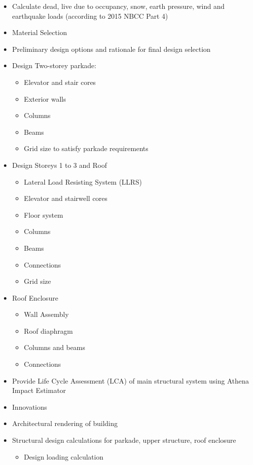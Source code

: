 \documentclass[12pt]{article}
\begin{document}
\begin{itemize}
    \item Calculate dead, live due to occupancy, snow, earth pressure, wind and earthquake loads (according to 2015 NBCC Part 4)
    \item Material Selection
    \item Preliminary design options and rationale for final design selection
    \item Design Two-storey parkade:
    \begin{itemize}
        \item Elevator and stair cores
        \item Exterior walls
        \item Columns
        \item Beams
        \item Grid size to satisfy parkade requirements
    \end{itemize}
    \item Design Storeys 1 to 3 and Roof
    \begin{itemize}
        \item Lateral Load Resisting System (LLRS)
        \item Elevator and stairwell cores
        \item Floor system
        \item Columns
        \item Beams
        \item Connections
        \item Grid size
    \end{itemize}
    \item Roof Enclosure
    \begin{itemize}
        \item Wall Assembly
        \item Roof diaphragm
        \item Columns and beams
        \item Connections
    \end{itemize}
    \item Provide Life Cycle Assessment (LCA) of main structural system using Athena Impact Estimator
    \item Innovations
    \item Architectural rendering of building
    \item Structural design calculations for parkade, upper structure, roof enclosure
    \begin{itemize}
        \item Design loading calculation

\end{itemize}
\end{itemize}
\end{document}
